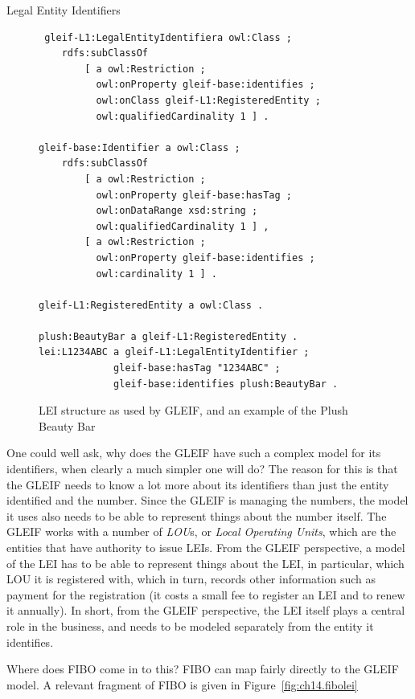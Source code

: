 \begin{challenge}{Legal Entity Identifiers}
\begin{figure}
 \begin{lstlisting}
 gleif-L1:LegalEntityIdentifiera owl:Class ;
	rdfs:subClassOf
		[ a owl:Restriction ;
 		  owl:onProperty gleif-base:identifies ;
 		  owl:onClass gleif-L1:RegisteredEntity ;
 		  owl:qualifiedCardinality 1 ] .

gleif-base:Identifier a owl:Class ;
	rdfs:subClassOf
		[ a owl:Restriction ;
 		  owl:onProperty gleif-base:hasTag ;
 		  owl:onDataRange xsd:string ;
 		  owl:qualifiedCardinality 1 ] ,
		[ a owl:Restriction ;
 		  owl:onProperty gleif-base:identifies ;
 		  owl:cardinality 1 ] .

gleif-L1:RegisteredEntity a owl:Class .

plush:BeautyBar a gleif-L1:RegisteredEntity .
lei:L1234ABC a gleif-L1:LegalEntityIdentifier ;
             gleif-base:hasTag "1234ABC" ;
             gleif-base:identifies plush:BeautyBar . 
 \end{lstlisting}
    \caption{LEI structure as used by GLEIF, and an example of the Plush Beauty Bar}
    \label{fig:ch14.gleifLEI}
\end{figure}

One could well ask, why does the GLEIF have such a complex model 
for its identifiers, when clearly a much simpler one will do? 
The reason for this is that the GLEIF needs to know a lot more 
about its identifiers than just the entity identified and the number.
Since the GLEIF is managing the numbers, the model it uses also needs to be able to represent 
things about the number itself.  The GLEIF works with a number of
\emph{LOU}s, or \emph{Local Operating Units}, which are the entities that
have authority to issue LEIs.  From the GLEIF perspective, a model 
of the LEI has to be able to represent things about the LEI, in particular,  
which LOU it is registered with, which in turn, records other information such 
as payment for the registration (it costs a small fee to register an LEI and to 
renew it annually).  In short, 
from the GLEIF
perspective, the LEI itself plays a central role in the business, and needs to be
modeled separately from the entity it identifies. 
\end{challenge}


Where does FIBO come in to this?    FIBO can map fairly directly 
to the GLEIF model.  A relevant fragment of FIBO is given in 
Figure~\ref{fig:ch14.fibolei}

